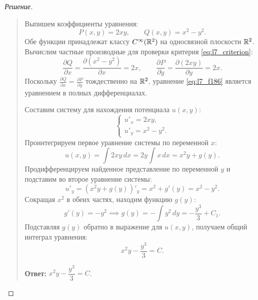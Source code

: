 \begin{proof}[Решение]~\\
    \begin{quote}
        Выпишем коэффициенты уравнения:
        \[
            P(x, y) = 2 x y, \qquad Q(x, y) = x^2 - y^2.
        \]
        Обе функции принадлежат классу $C^\infty(\mathbb{R}^2)$ на односвязной
        плоскости $\mathbb{R}^2$. Вычислим частные производные для проверки критерия
        \eqref{eq:l7_criterion}:
        \[
            \frac{\partial Q}{\partial x} =
            \frac{\partial \left(x^2 - y^2\right)}{\partial x} = 2x, \qquad
            \frac{\partial P}{\partial y} =
            \frac{\partial (2 x y)}{\partial y} = 2x.
        \]
        Поскольку $\frac{\partial Q}{\partial x} = \frac{\partial P}{\partial y}$
        тождественно на $\mathbb{R}^2$, уравнение \eqref{eq:l7_f186} является уравнением
        в полных дифференциалах.

        Составим систему для нахождения потенциала $u(x, y)$:
        \[
            \begin{cases}
                u'_x = 2 x y, \\
                u'_y = x^2 - y^2.
            \end{cases}
        \]
        Проинтегрируем первое уравнение системы по переменной $x$:
        \[
            u(x, y) = \int 2 x y \, dx = 2 y \int x \, dx = x^2 y + g(y).
        \]
        Продифференцируем найденное представление по переменной $y$ и
        подставим во второе уравнение системы:
        \[
            u'_y = \left(x^2 y + g(y)\right)'_y = x^2 + g'(y) = x^2 - y^2.
        \]
        Сокращая $x^2$ в обеих частях, находим функцию $g(y)$:
        \[
            g'(y) = -y^2 \implies g(y) = -\int y^2 \, dy = -\frac{y^3}{3} + C_1.
        \]
        Подставляя $g(y)$ обратно в выражение для $u(x, y)$, получаем общий
        интеграл уравнения:
        \[
            x^2 y - \frac{y^3}{3} = C.
        \]

        \textbf{Ответ:} $x^2 y - \dfrac{y^3}{3} = C$.
    \end{quote}
\end{proof}

